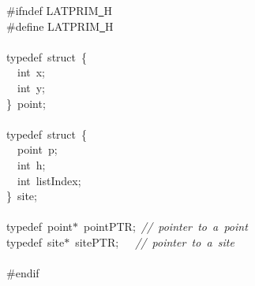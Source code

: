 {\ttfamily \raggedright \small
\#ifndef LATPRIM\underline\ H\\
\#define LATPRIM\underline\ H\\
\ \\
typedef\ struct\ \{\\
\ \ int\ x;\\
\ \ int\ y;\\
\}\ point;\\
\ \\
typedef\ struct\ \{\\
\ \ point\ p;\\
\ \ int\ h;\\
\ \ int\ listIndex;\\
\}\ site;\\
\ \\
typedef\ point$\ast$\ pointPTR;\ \textsl{//\ pointer\ to\ a\ point}\\
typedef\ site$\ast$\ sitePTR;\ \ \ \textsl{//\ pointer\ to\ a\ site}\\
\ \\
\#endif\\
\ \\
 }
\normalfont\normalsize

